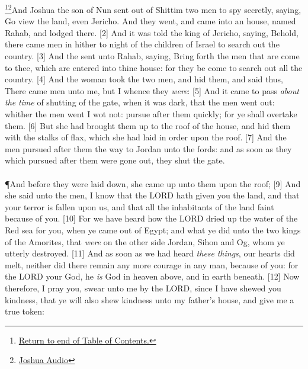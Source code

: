 \footnote{\textcolor[cmyk]{0.99998,1,0,0}{\hyperlink{TOC}{Return to end of Table of Contents.}}}\footnote{\href{https://audiobible.com/bible/joshua_1.html}{\textcolor[cmyk]{0.99998,1,0,0}{Joshua Audio}}}\textcolor[cmyk]{0.99998,1,0,0}{And Joshua the son of Nun sent out of Shittim two men to spy secretly, saying, Go view the land, even Jericho. And they went, and came into an  house, named Rahab, and lodged there.}
[2] \textcolor[cmyk]{0.99998,1,0,0}{And it was told the king of Jericho, saying, Behold, there came men in hither to night of the children of Israel to search out the country.}
[3] \textcolor[cmyk]{0.99998,1,0,0}{And the  sent unto Rahab, saying, Bring forth the men that are come to thee, which are entered into thine house: for they be come to search out all the country.}
[4] \textcolor[cmyk]{0.99998,1,0,0}{And the woman took the two men, and hid them, and said thus, There came men unto me, but I  whence they \emph{were}:}
[5] \textcolor[cmyk]{0.99998,1,0,0}{And it came to pass \emph{about} \emph{the} \emph{time} of shutting of the gate, when it was dark, that the men went out: whither the men went I wot not: pursue after them quickly; for ye shall overtake them.}
[6] \textcolor[cmyk]{0.99998,1,0,0}{But she had brought them up to the roof of the house, and hid them with the stalks of flax, which she had laid in order upon the roof.}
[7] \textcolor[cmyk]{0.99998,1,0,0}{And the men pursued after them the way to Jordan unto the fords: and as soon as they which pursued after them were gone out, they shut the gate.}\\
\\
\P \textcolor[cmyk]{0.99998,1,0,0}{And before they were laid down, she came up unto them upon the roof;}
[9] \textcolor[cmyk]{0.99998,1,0,0}{And she said unto the men, I know that the LORD hath given you the land, and that your terror is fallen upon us, and that all the inhabitants of the land faint because of you.}
[10] \textcolor[cmyk]{0.99998,1,0,0}{For we have heard how the LORD dried up the water of the Red sea for you, when ye came out of Egypt; and what ye did unto the two kings of the Amorites, that \emph{were} on the other side Jordan, Sihon and Og, whom ye utterly destroyed.}
[11] \textcolor[cmyk]{0.99998,1,0,0}{And as soon as we had heard \emph{these} \emph{things}, our hearts did melt, neither did there remain any more courage in any man, because of you: for the LORD your God, he \emph{is} God in heaven above, and in earth beneath.}
[12] \textcolor[cmyk]{0.99998,1,0,0}{Now therefore, I pray you, swear unto me by the LORD, since I have shewed you kindness, that ye will also shew kindness unto my father's house, and give me a true token:}
